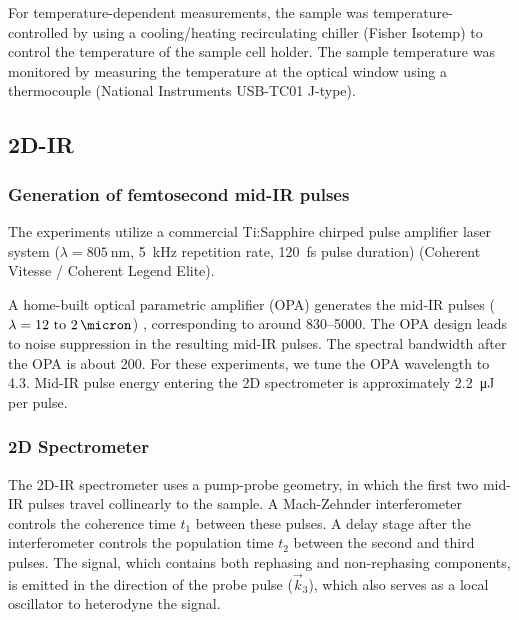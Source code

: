 \documentclass[%
  class = book,%
  crop = false,%
  float = true,%
  multi = true,%
  preview = false,%
]{standalone}
\let\cite\autocite
\begin{document}
{For temperature-dependent measurements, the sample was temperature-controlled by using a cooling/heating recirculating chiller (Fisher Isotemp) to control the temperature of the sample cell holder. The sample temperature was monitored by measuring the temperature at the optical window using a thermocouple (National Instruments USB-TC01 J-type).

\subsection{2D-IR}
\label{sec:anions_methods_tdir}

\subsubsection{Generation of femtosecond mid-IR pulses}
\label{sec:anions_methods_tdir_generation}

The experiments utilize a commercial Ti:Sapphire chirped pulse amplifier laser system (\(\lambda = \SI{805}{\nm}\), \SI{5}{\kilo\hertz} repetition rate, \SI{120}{\fs} pulse duration) (Coherent Vitesse / Coherent Legend Elite).

A home-built optical parametric amplifier (OPA) generates the mid-IR pulses (\(\lambda = \SIrange{12}{2}{\micron}\)) , corresponding to around \SIrange{830}{5000}{\wavenumber}. The OPA design leads to noise suppression in the resulting mid-IR pulses.\cite{Hamm2000} The spectral bandwidth after the OPA is about \SI{200}{\wavenumber}. For these experiments, we tune the OPA wavelength to \SI{4.3}{\micron}. Mid-IR pulse energy entering the 2D spectrometer is approximately \SI{2.2}{\micro\joule} per pulse.

\subsubsection{2D Spectrometer}
\label{sec:anions_methods_tdir_spectrometer}

The 2D-IR spectrometer uses a pump-probe geometry,\cite{Helbing2010} in which the first two mid-IR pulses travel collinearly to the sample. A Mach-Zehnder interferometer controls the coherence time \(t_1\) between these pulses. A delay stage after the interferometer controls the population time \(t_2\) between the second and third pulses. The signal, which contains both rephasing and non-rephasing components, is emitted in the direction of the probe pulse (\(\vec{k}_3\)), which also serves as a local oscillator to heterodyne the signal.

}
\end{document}
